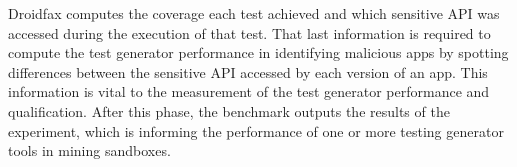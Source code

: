 Droidfax computes the coverage each test achieved and which sensitive API was accessed during the execution of that test. That last information is required to compute the test generator performance in identifying malicious apps by spotting differences between the sensitive API accessed by each version of an app. This information is vital to the measurement of the test generator performance and qualification. After this phase, the benchmark outputs the results of the experiment, which is informing the performance of one or more testing generator tools in mining sandboxes.

